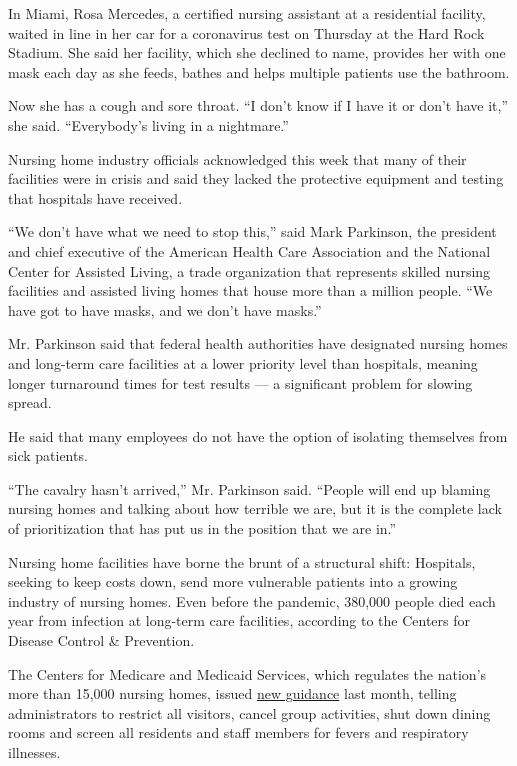 In Miami, Rosa Mercedes, a certified nursing assistant at a residential
facility, waited in line in her car for a coronavirus test on Thursday
at the Hard Rock Stadium. She said her facility, which she declined to
name, provides her with one mask each day as she feeds, bathes and helps
multiple patients use the bathroom.

Now she has a cough and sore throat. ``I don't know if I have it or
don't have it,'' she said. ``Everybody's living in a nightmare.''

Nursing home industry officials acknowledged this week that many of
their facilities were in crisis and said they lacked the protective
equipment and testing that hospitals have received.

``We don't have what we need to stop this,'' said Mark Parkinson, the
president and chief executive of the American Health Care Association
and the National Center for Assisted Living, a trade organization that
represents skilled nursing facilities and assisted living homes that
house more than a million people. ``We have got to have masks, and we
don't have masks.''

Mr. Parkinson said that federal health authorities have designated
nursing homes and long-term care facilities at a lower priority level
than hospitals, meaning longer turnaround times for test results --- a
significant problem for slowing spread.

He said that many employees do not have the option of isolating
themselves from sick patients.

``The cavalry hasn't arrived,'' Mr. Parkinson said. ``People will end up
blaming nursing homes and talking about how terrible we are, but it is
the complete lack of prioritization that has put us in the position that
we are in.''

Nursing home facilities have borne the brunt of a structural shift:
Hospitals, seeking to keep costs down, send more vulnerable patients
into a growing industry of nursing homes. Even before the pandemic,
380,000 people died each year from infection at long-term care
facilities, according to the Centers for Disease Control \& Prevention.

The Centers for Medicare and Medicaid Services, which regulates the
nation's more than 15,000 nursing homes, issued
\href{https://www.cms.gov/files/document/qso-20-14-nh-revised.pdf}{new
guidance} last month, telling administrators to restrict all visitors,
cancel group activities, shut down dining rooms and screen all residents
and staff members for fevers and respiratory illnesses.

